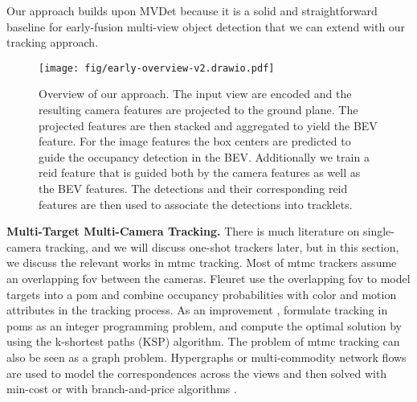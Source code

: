\documentclass[10pt,twocolumn,letterpaper]{article}
\newcommand{\nparagraph}[1]{\noindent\textbf{#1.  }}
\begin{document}
Our approach builds upon MVDet \cite{hou2020multiview} because it is a solid and straightforward baseline for early-fusion multi-view object detection that we can extend with our tracking approach. 

\begin{figure*}[t]
  \centering
\texttt{[image: fig/early-overview-v2.drawio.pdf]}

   \caption{Overview of our approach. The input view are encoded and the resulting camera features are projected to the ground plane. The projected features are then stacked and aggregated to yield the BEV feature. For the image features the box centers are predicted to guide the occupancy detection in the BEV. Additionally we train a \gls{reid} feature that is guided both by the camera features as well as the BEV features. The detections and their corresponding \gls{reid} features are then used to associate the detections into tracklets.}
   \label{fig:overview}
\end{figure*}

\nparagraph{Multi-Target Multi-Camera Tracking}
There is much literature on single-camera tracking, and we will discuss one-shot trackers later, but in this section, we discuss the relevant works in \gls{mtmc} tracking. Most of \gls{mtmc} trackers assume an overlapping \gls{fov} between the cameras. Fleuret \etal \cite{fleuret2007multicamera} use the overlapping \gls{fov} to model targets into a \gls{pom} and combine occupancy probabilities with color and motion attributes in the tracking process. As an improvement \cite{berclaz2011multiple}, formulate tracking in \gls{pom}s as an integer programming problem, and compute the optimal solution by using the k-shortest paths (KSP) algorithm.
The problem of \gls{mtmc} tracking can also be seen as a graph problem. Hypergraphs \cite{hofmann2013hypergraphs} or multi-commodity network flows \cite{shitrit2013multi, leal2012branch} are used to model the correspondences across the views and then solved with min-cost \cite{hofmann2013hypergraphs, shitrit2013multi} or with branch-and-price algorithms \cite{leal2012branch}.
\end{document}
